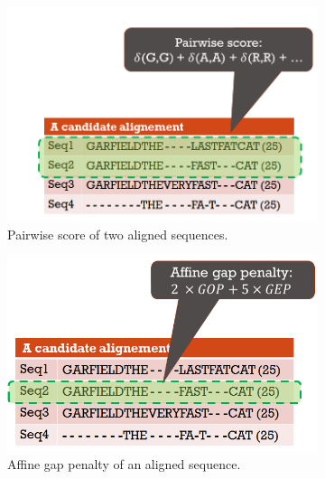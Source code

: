\begin{itemize}
	
	\begin{figure}[!htbp]
		\begin{adjustwidth}{-0.2cm}{}
			\centering
			\begin{subfigure}[b]{0.5\columnwidth}
				\includegraphics[width=\columnwidth]{Figure/pairwise}
				\caption{Pairwise score of two aligned sequences.}
				\label{fig:pairwise}
			\end{subfigure}	
			\begin{subfigure}[b]{0.45\columnwidth}
				\includegraphics[width=\columnwidth]{Figure/agp}
				\caption{Affine gap penalty of an aligned sequence.}
				\label{fig:agp}
			\end{subfigure}
			\begin{subfigure}[b]{0.45\columnwidth}

\end{subfigure}
\end{adjustwidth}
\end{figure}
\end{itemize}

